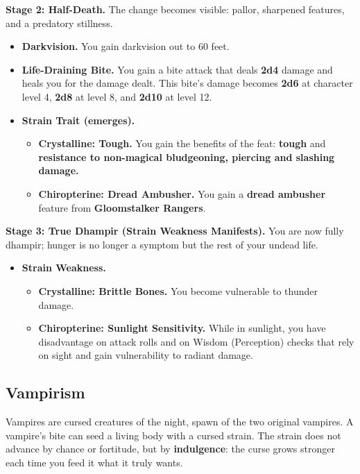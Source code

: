 \documentclass{apotheosis-book}
\begin{document}
\textbf{Stage 2: Half-Death.}
The change becomes visible: pallor, sharpened features, and a predatory stillness.
\begin{itemize}
\item \textbf{Darkvision.} You gain darkvision out to 60 feet.
\item \textbf{Life-Draining Bite.} You gain a bite attack that deals \textbf{2d4} damage and heals you for the damage dealt. This bite's damage becomes \textbf{2d6} at character level 4, \textbf{2d8} at level 8, and \textbf{2d10} at level 12.
\item \textbf{Strain Trait (emerges).}
\begin{itemize}
\item \textbf{Crystalline: Tough.} You gain the benefits of the feat: \textbf{tough} and \textbf{resistance to non-magical bludgeoning, piercing and slashing damage.}
\item \textbf{Chiropterine: Dread Ambusher.} You gain a \textbf{dread ambusher} feature from \textbf{Gloomstalker Rangers}.
\end{itemize}
\end{itemize}

\textbf{Stage 3: True Dhampir (Strain Weakness Manifests).}
You are now fully dhampir; hunger is no longer a symptom but the rest of your undead life.
\begin{itemize}
\item \textbf{Strain Weakness.}
\begin{itemize}
\item \textbf{Crystalline: Brittle Bones.} You become vulnerable to thunder damage.
\item \textbf{Chiropterine: Sunlight Sensitivity.} While in sunlight, you have disadvantage on attack rolls and on Wisdom (Perception) checks that rely on sight and gain vulnerability to radiant damage.
\end{itemize}
\end{itemize}

\subsection{Vampirism}

Vampires are cursed creatures of the night, spawn of the two original vampires. A vampire's bite can seed a living body with a cursed strain. The strain does not advance by chance or fortitude, but by \textbf{indulgence}: the curse grows stronger each time you feed it what it truly wants.
\end{document}
